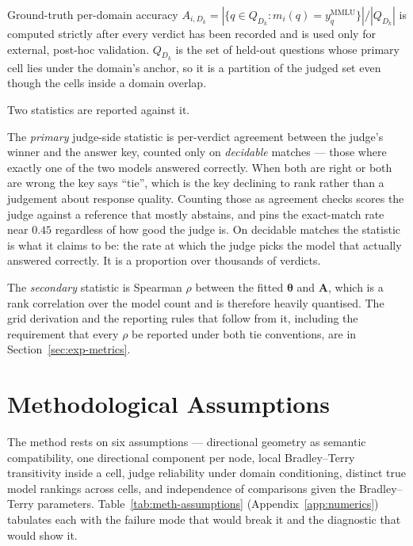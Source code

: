 Ground-truth per-domain accuracy
$A_{i,D_k} = |\{q \in Q_{D_k} : m_i(q) = y_q^{\text{MMLU}}\}| /
|Q_{D_k}|$
is computed strictly after every verdict has been recorded and is used
only for external, post-hoc validation. $Q_{D_k}$ is the set of
held-out questions whose primary cell lies under the domain's anchor,
so it is a partition of the judged set even though the cells inside a
domain overlap.

Two statistics are reported against it.

The \emph{primary} judge-side statistic is per-verdict agreement
between the judge's winner and the answer key, counted only on
\emph{decidable} matches --- those where exactly one of the two models
answered correctly. When both are right or both are wrong the key says
``tie'', which is the key declining to rank rather than a judgement
about response quality. Counting those as agreement checks scores the
judge against a reference that mostly abstains, and pins the
exact-match rate near $0.45$ regardless of how good the judge is. On
decidable matches the statistic is what it claims to be: the rate at
which the judge picks the model that actually answered correctly. It is
a proportion over thousands of verdicts.

The \emph{secondary} statistic is Spearman $\rho$ between the fitted
$\boldsymbol{\theta}$ and $\mathbf{A}$, which is a rank correlation
over the model count and is therefore heavily quantised. The grid
derivation and the reporting rules that follow from it, including the
requirement that every $\rho$ be reported under both tie conventions,
are in Section~\ref{sec:exp-metrics}.

\section{Methodological Assumptions}\label{sec:meth-assumptions}

The method rests on six assumptions --- directional geometry as
semantic compatibility, one directional component per node, local
Bradley--Terry transitivity inside a cell, judge reliability under
domain conditioning, distinct true model rankings across cells, and
independence of comparisons given the Bradley--Terry parameters.
Table~\ref{tab:meth-assumptions} (Appendix~\ref{app:numerics})
tabulates each with the failure mode that would break it and the
diagnostic that would show it.

